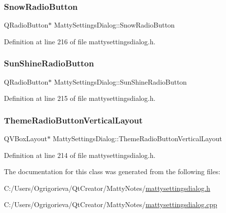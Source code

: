 \subsubsection{\texorpdfstring{Snow\+Radio\+Button}{SnowRadioButton}}
{\footnotesize\ttfamily Q\+Radio\+Button$\ast$ Matty\+Settings\+Dialog\+::\+Snow\+Radio\+Button\hspace{0.3cm}{\ttfamily [private]}}



Definition at line 216 of file mattysettingsdialog.\+h.

\hypertarget{classMattySettingsDialog_a58a1d3e1f6837337e641854d89e08317}{}\label{classMattySettingsDialog_a58a1d3e1f6837337e641854d89e08317} 
\subsubsection{\texorpdfstring{Sun\+Shine\+Radio\+Button}{SunShineRadioButton}}
{\footnotesize\ttfamily Q\+Radio\+Button$\ast$ Matty\+Settings\+Dialog\+::\+Sun\+Shine\+Radio\+Button\hspace{0.3cm}{\ttfamily [private]}}



Definition at line 215 of file mattysettingsdialog.\+h.

\hypertarget{classMattySettingsDialog_a2b7a07510ef76c1161d247437e0a39c0}{}\label{classMattySettingsDialog_a2b7a07510ef76c1161d247437e0a39c0} 
\subsubsection{\texorpdfstring{Theme\+Radio\+Button\+Vertical\+Layout}{ThemeRadioButtonVerticalLayout}}
{\footnotesize\ttfamily Q\+V\+Box\+Layout$\ast$ Matty\+Settings\+Dialog\+::\+Theme\+Radio\+Button\+Vertical\+Layout\hspace{0.3cm}{\ttfamily [private]}}



Definition at line 214 of file mattysettingsdialog.\+h.



The documentation for this class was generated from the following files\+:\begin{DoxyCompactItemize}
\item 
C\+:/\+Users/\+Ogrigorieva/\+Qt\+Creator/\+Matty\+Notes/\hyperlink{mattysettingsdialog_8h}{mattysettingsdialog.\+h}\item 
C\+:/\+Users/\+Ogrigorieva/\+Qt\+Creator/\+Matty\+Notes/\hyperlink{mattysettingsdialog_8cpp}{mattysettingsdialog.\+cpp}\end{DoxyCompactItemize}
